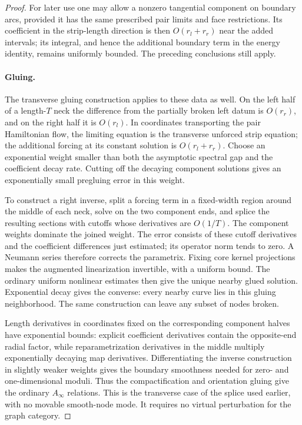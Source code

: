 \documentclass[11pt]{article}
\theoremstyle{definition}
\theoremstyle{remark}
\newcommand{\Ainf}{A_\infty}
\numberwithin{equation}{section}
\begin{document}
\begin{proof}
For later use one may allow a nonzero tangential component on boundary
arcs, provided it has the same prescribed pair limits and face
restrictions.  Its coefficient in the strip-length direction is then
\(O(r_l+r_r)\) near the added intervals; its integral, and hence the
additional boundary term in the energy identity, remains uniformly
bounded.  The preceding conclusions still apply.

\paragraph{Gluing.}
The transverse gluing construction applies to these data as well.
On the left half of a length-\(T\) neck the difference from the
partially broken left datum is \(O(r_r)\), and on the right half it is
\(O(r_l)\).  In coordinates transporting the pair Hamiltonian flow,
the limiting equation is the transverse unforced strip equation;
the additional forcing at its constant solution is
\(O(r_l+r_r)\).  Choose an exponential weight smaller than both the
asymptotic spectral gap and the coefficient decay rate.  Cutting off
the decaying component solutions gives an exponentially small
pregluing error in this weight.

To construct a right inverse, split a forcing term in a fixed-width
region around the middle of each neck, solve on the two component
ends, and splice the resulting sections with cutoffs whose derivatives
are \(O(1/T)\).  The component weights dominate the joined weight.
The error consists of these cutoff derivatives and the coefficient
differences just estimated; its operator norm tends to zero.
A Neumann series therefore corrects the parametrix.  Fixing core kernel
projections makes the augmented linearization invertible, with a
uniform bound.  The ordinary uniform nonlinear estimates then give
the unique nearby glued solution.  Exponential decay gives the
converse: every nearby curve lies in this gluing neighborhood.
The same construction can leave any subset of nodes broken.

Length derivatives in coordinates fixed on the corresponding
component halves have exponential bounds: explicit coefficient
derivatives contain the opposite-end radial factor, while
reparametrization derivatives in the middle multiply exponentially
decaying map derivatives.  Differentiating the inverse construction
in slightly weaker weights gives the boundary smoothness needed for
zero- and one-dimensional moduli.  Thus the compactification and
orientation gluing give the ordinary \(\Ainf\) relations.  This is the
transverse case of the splice used earlier, with no movable
smooth-node mode.  It requires no virtual perturbation for the graph
category.


\end{proof}
\end{document}
